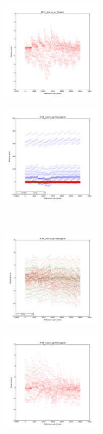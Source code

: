 \begin{center}
\begin{figure}[!h]
		\begin{subfigure}[b]{0.45\textwidth}
				\includegraphics[width=\linewidth,height=5cm]{images/MOX/MOX_macro_nu_fission1_alone.png}
		\end{subfigure}
\end{figure}
\begin{figure}[!h]\ContinuedFloat
		\centering
		\begin{subfigure}[b]{0.45\textwidth}
				\includegraphics[width=\linewidth,height=5cm]{images/MOX/MOX_macro_scattering010_with_cocagne.png}
		\end{subfigure}
		~
		\begin{subfigure}[b]{0.45\textwidth}
				\includegraphics[width=\linewidth,height=5cm]{images/MOX/MOX_macro_scattering010.png}
		\end{subfigure}
		\begin{subfigure}[b]{0.45\textwidth}
				\includegraphics[width=\linewidth,height=5cm]{images/MOX/MOX_macro_scattering010_alone.png}

\end{subfigure}
\end{figure}
\end{center}
